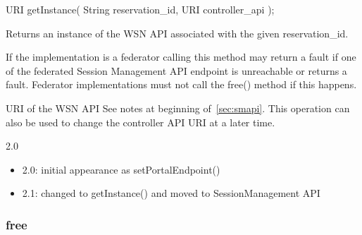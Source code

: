 \begin{apidoc}
	{URI getInstance( String reservation_id, URI controller_api );} %
	{
		Returns an instance of the WSN API associated with the given reservation\_id.
		
		If the implementation is a federator calling this method may return a fault if one of the federated Session Management API endpoint is unreachable or returns a fault. Federator implementations  must not call the free() method if this happens.
	} %
	{
	} %
	{URI of the WSN API} %
	{See notes at beginning of~\ref{sec:smapi}. This operation can also be used to change the controller API URI at a later time.} %
	{2.0
		\begin{itemize}
			\item 2.0: initial appearance as setPortalEndpoint()
			\item 2.1: changed to getInstance() and moved to SessionManagement API
		\end{itemize}
	} %
\end{apidoc}

			\subsubsection{free}

